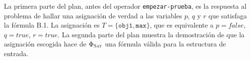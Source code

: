 La primera parte del plan, antes del operador \texttt{empezar-prueba}, es la
respuesta al problema de hallar una asignación de verdad a las variables $p$,
$q$ y $r$ que satisfaga la fórmula B.1. La asignación es $T =
\{\texttt{obj1}, \texttt{max}\}$, que es equivalente a $p = false$, $q = true$, $r = true$.
La segunda parte del plan muestra la demostración de que la asignación escogida
hace de $\Phi_{\textsc{Sat}}$ una fórmula válida para la estructura de entrada.
